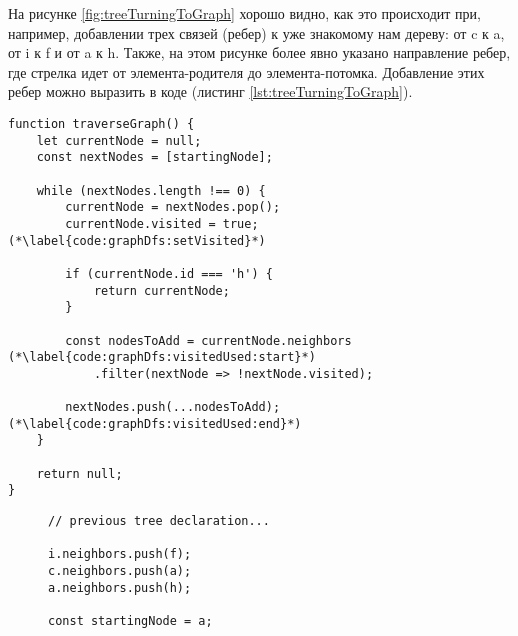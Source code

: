\documentclass[../../article.tex]{subfiles}
\begin{document}
На рисунке \ref{fig:treeTurningToGraph} хорошо видно, как это происходит при, например, добавлении трех связей (ребер) к уже знакомому нам дереву: от {\firacodebold c} к {\firacodebold a}, от {\firacodebold i} к {\firacodebold f} и от {\firacodebold a} к {\firacodebold h}. Также, на этом рисунке более явно указано направление ребер, где стрелка идет от элемента-родителя до элемента-потомка. Добавление этих ребер можно выразить в коде (листинг \ref{lst:treeTurningToGraph}).

\begin{figure*}
    \begin{ruledelement}
        \begin{lstlisting}[caption={Обход графа в глубину}, label={lst:graphDfs}]
function traverseGraph() {
    let currentNode = null;
    const nextNodes = [startingNode];

    while (nextNodes.length !== 0) {
        currentNode = nextNodes.pop();
        currentNode.visited = true; (*\label{code:graphDfs:setVisited}*)

        if (currentNode.id === 'h') {
            return currentNode;
        }

        const nodesToAdd = currentNode.neighbors (*\label{code:graphDfs:visitedUsed:start}*)
            .filter(nextNode => !nextNode.visited);

        nextNodes.push(...nodesToAdd); (*\label{code:graphDfs:visitedUsed:end}*)
    }

    return null;
}
        \end{lstlisting}
    \end{ruledelement}

\end{figure*}

\begin{figure}
    \begin{ruledelement}
        \begin{lstlisting}[caption={Добавление связей превращающих дерево в грфа}, label={lst:treeTurningToGraph}]
// previous tree declaration...

i.neighbors.push(f);
c.neighbors.push(a);
a.neighbors.push(h);

const startingNode = a;
        \end{lstlisting}
    \end{ruledelement}
\end{figure}
\end{document}
